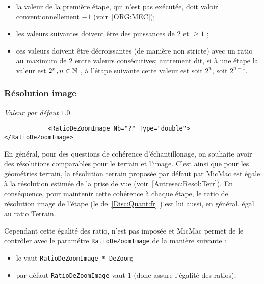 \begin{itemize}
   \item  la valeur de la premi\`ere \'etape, qui n'est pas ex\'ecut\'ee,
          doit valoir conventionnellement $-1$ (voir~\ref{ORG:MEC});

   \item  les valeurs suivantes doivent \^etre des puissances de $2$
          et $\geq1$ ;

   \item  ces valeurs doivent \^etre d\'ecroissantes (de mani\`ere non
          stricte)  avec un ratio au maximum de $2$ entre valeurs
          cons\'ecutives;
          autrement  dit, si \`a une \'etape la valeur est  $2^n, n\in \mathbb{N}$ ,
          \`a l'\'etape suivante cette valeur est  soit $2^n$, soit $2^{n-1}$.
\end{itemize}

\subsubsection{R\'esolution image}
\emph{Valeur par d\'efaut $1.0$}
\begin{verbatim}
            <RatioDeZoomImage Nb="?" Type="double"> </RatioDeZoomImage>
\end{verbatim}

En g\'en\'eral, pour des questions de coh\'erence d'\'echantillonage,
on souhaite avoir des r\'esolutions comparables pour
le terrain et l'image.
C'est ainsi que pour les g\'eom\'etries
terrain, la r\'esolution terrain propos\'ee par d\'efaut par
MicMac est \'egale \`a la r\'esolution estim\'ee
 de la prise de vue (voir~\ref{Autresec:Resol:Terr}).
En cons\'equence,  pour maintenir cette coh\'erence \`a chaque \'etape,
le ratio de r\'esolution image  de l'\'etape
(le \DeltaI de~\ref{Disc:Quant:fr} ) est  lui aussi, en g\'en\'eral,
\'egal  au ratio Terrain.

Cependant cette \'egalit\'e des ratio, n'est pas impos\'ee et
MicMac permet de le contr\^oler avec le param\'etre
{\tt RatioDeZoomImage} de la mani\`ere suivante :


\begin{itemize}
     \item le \DeltaI vaut {\tt RatioDeZoomImage * DeZoom};
     \item  par d\'efaut {\tt RatioDeZoomImage} vaut $1$
            (donc assure l'\'egalit\'e des ratios);
\end{itemize}

